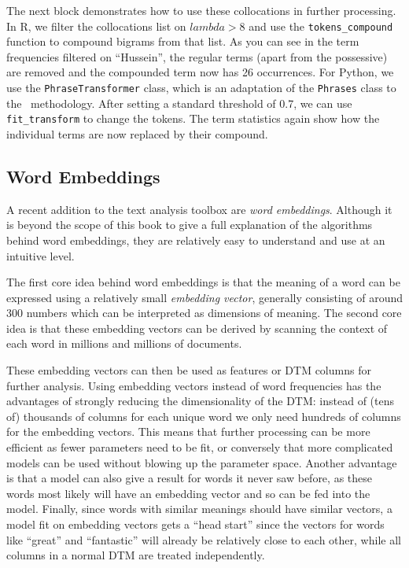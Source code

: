 The next block demonstrates how to use these collocations in further processing.
In R, we filter the collocations list on $lambda>8$ and use the \texttt{tokens\_compound} function to compound bigrams from that list.
As you can see in the term frequencies filtered on ``Hussein'', the regular terms (apart from the possessive) are removed and the compounded term now has 26 occurrences.
For Python, we use the \texttt{PhraseTransformer} class, which is an adaptation of the \texttt{Phrases} class to the \sklearn\ methodology.
After setting a standard threshold of 0.7, we can use \texttt{fit\_transform} to change the tokens.
The term statistics again show how the individual terms are now replaced by their compound.


\subsection{Word Embeddings}
\label{sec:wordembeddings}
A recent addition to the text analysis toolbox are \emph{word embeddings}.
Although it is beyond the scope of this book to give a full explanation of the algorithms behind word embeddings,
they are relatively easy to understand and use at an intuitive level.

The first core idea behind word embeddings is that the meaning of a word can be expressed using a relatively small \emph{embedding vector}, generally consisting of around 300 numbers which can be interpreted as dimensions of meaning.
The second core idea is that these embedding vectors can be derived by scanning the context of each word in millions and millions of documents.


These embedding vectors can then be used as features or DTM columns for further analysis.
Using embedding vectors instead of word frequencies has the advantages of strongly reducing the dimensionality of the DTM:
instead of (tens of) thousands of columns for each unique word we only need hundreds of columns for the embedding vectors.
This means that further processing can be more efficient as fewer parameters need to be fit,
or conversely that more complicated models can be used without blowing up the parameter space.
Another advantage is that a model can also give a result for words it never saw before, as these words most likely will have an embedding vector and so can be fed into the model.
Finally, since words with similar meanings should have similar vectors,
a model fit on embedding vectors gets a ``head start'' since the vectors for words like ``great'' and ``fantastic'' will already be relatively close to each other, while all columns in a normal DTM are treated independently.

